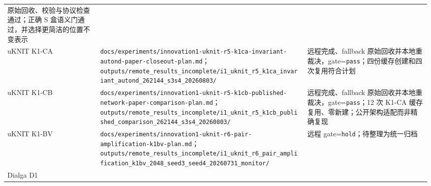 \documentclass[
  a4paper,
  UTF8]{ctexart}
\begin{document}
\begin{longtable}[]{@{}lll@{}}
\begin{minipage}[t]{0.30\columnwidth}
原始回收、校验与协议检查通过；正确 S
盒语义门通过，并选择更简洁的位置不变表示\strut
\end{minipage}\tabularnewline
\begin{minipage}[t]{0.30\columnwidth}\raggedright
uKNIT K1-CA\strut
\end{minipage} & \begin{minipage}[t]{0.30\columnwidth}\raggedright
\nolinkurl{docs/experiments/innovation1-uknit-r5-k1ca-invariant-autond-paper-closeout-plan.md}；\nolinkurl{outputs/remote_results_incomplete/i1_uknit_r5_k1ca_invariant_autond_262144_s3s4_20260803/}\strut
\end{minipage} & \begin{minipage}[t]{0.30\columnwidth}\raggedright
远程完成、fallback 原始回收并本地重裁决，gate=\texttt{pass}；四份缓存创建和四次复用符合计划\strut
\end{minipage}\tabularnewline
\begin{minipage}[t]{0.30\columnwidth}\raggedright
uKNIT K1-CB\strut
\end{minipage} & \begin{minipage}[t]{0.30\columnwidth}\raggedright
\nolinkurl{docs/experiments/innovation1-uknit-r5-k1cb-published-network-paper-comparison-plan.md}；\nolinkurl{outputs/remote_results_incomplete/i1_uknit_r5_k1cb_published_comparison_262144_s3s4_20260803/}\strut
\end{minipage} & \begin{minipage}[t]{0.30\columnwidth}\raggedright
远程完成、fallback 原始回收并本地重裁决，gate=\texttt{pass}；12 次 K1-CA 缓存复用、零新建；公开架构适配而非精确复现\strut
\end{minipage}\tabularnewline
\begin{minipage}[t]{0.30\columnwidth}\raggedright
uKNIT K1-BV\strut
\end{minipage} & \begin{minipage}[t]{0.30\columnwidth}\raggedright
\nolinkurl{docs/experiments/innovation1-uknit-r6-pair-amplification-k1bv-plan.md}；\nolinkurl{outputs/remote_results_incomplete/i1_uknit_r6_pair_amplification_k1bv_2048_seed3_seed4_20260731_monitor/}\strut
\end{minipage} & \begin{minipage}[t]{0.30\columnwidth}\raggedright
远程 gate=\texttt{hold}；待整理为统一归档\strut
\end{minipage}\tabularnewline
\begin{minipage}[t]{0.30\columnwidth}\raggedright
Dialga D1\strut
\end{minipage} & \begin{minipage}[t]{0.30\columnwidth}\raggedright

\end{minipage}
\end{longtable}
\end{document}
